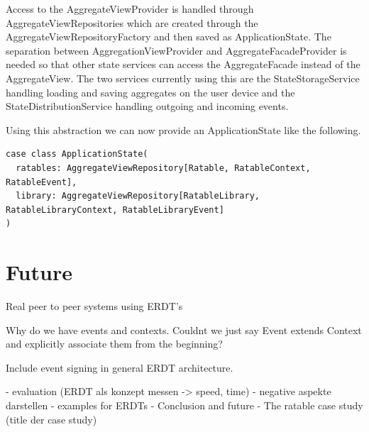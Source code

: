 \documentclass[
	ngerman,
	ruledheaders=section,   %
	class=report,		    %
	thesis={type=bachelor}, %
	accentcolor=9c,			%
	custommargins=true,    %
	marginpar=false,        %
	parskip=half-,          %
	fontsize=11pt,          %
]{tudapub}
\begin{document}
Access to the AggregateViewProvider is handled through AggregateViewRepositories which are created through the AggregateViewRepositoryFactory and then saved as ApplicationState. The separation between AggregationViewProvider and AggregateFacadeProvider is needed so that other state services can access the AggregateFacade instead of the AggregateView. The two services currently using this are the StateStorageService handling loading and saving aggregates on the user device and the StateDistributionService handling outgoing and incoming events. 

Using this abstraction we can now provide an ApplicationState like the following.

\begin{lstlisting}
case class ApplicationState(
  ratables: AggregateViewRepository[Ratable, RatableContext, RatableEvent],
  library: AggregateViewRepository[RatableLibrary, RatableLibraryContext, RatableLibraryEvent]
)
\end{lstlisting}

\chapter{Future}
Real peer to peer systems using ERDT's 

Why do we have events and contexts. Couldnt we just say Event extends Context and explicitly associate them from the beginning?

Include event signing in general ERDT architecture.

- evaluation (ERDT als konzept messen -> speed, time)
- negative aspekte darstellen
- examples for ERDTs
- Conclusion and future
- The ratable case study (title der case study)
\end{document}
